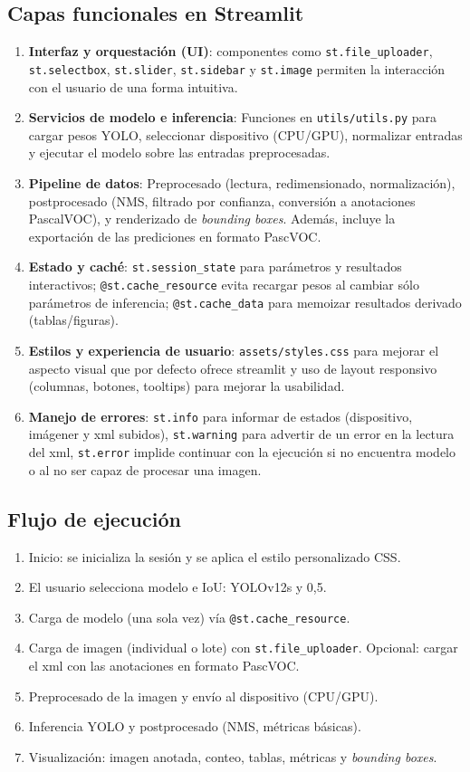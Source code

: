 \documentclass[12pt,a4paper,onecolumn,oneside]{report}
\begin{document}
\subsection{Capas funcionales en Streamlit}
\begin{enumerate}
  \item \textbf{Interfaz y orquestación (UI)}: componentes como \texttt{st.file\_uploader}, \texttt{st.selectbox}, \texttt{st.slider}, \texttt{st.sidebar} y \texttt{st.image} permiten la interacción con el usuario de una forma intuitiva.
  \item \textbf{Servicios de modelo e inferencia}: Funciones en \texttt{utils/utils.py} para cargar pesos YOLO, seleccionar dispositivo (CPU/GPU), normalizar entradas y ejecutar el modelo sobre las entradas preprocesadas.
  \item \textbf{Pipeline de datos}: Preprocesado (lectura, redimensionado, normalización), postprocesado (NMS, filtrado por confianza, conversión a anotaciones PascalVOC), y renderizado de \textit{bounding boxes}. 
  Además, incluye la exportación de las prediciones en formato PascVOC. 
  \item \textbf{Estado y caché}: \texttt{st.session\_state} para parámetros y resultados interactivos; \texttt{@st.cache\_resource} evita recargar 
  pesos al cambiar sólo parámetros de inferencia; \texttt{@st.cache\_data} para memoizar resultados derivado (tablas/figuras).
  \item \textbf{Estilos y experiencia de usuario}: \texttt{assets/styles.css} para mejorar el aspecto visual que por defecto ofrece streamlit y uso de layout 
  responsivo (columnas, botones, tooltips) para mejorar la usabilidad.
  \item \textbf{Manejo de errores}: \texttt{st.info} para informar de estados (dispositivo, imágener y xml subidos), \texttt{st.warning} para advertir de un error en la lectura del xml, 
  \texttt{st.error} implide continuar con la ejecución si no encuentra modelo o al no ser capaz de procesar una imagen.
\end{enumerate}

\subsection{Flujo de ejecución}
\begin{enumerate}
  \item Inicio: se inicializa la sesión y se aplica el estilo personalizado CSS.
  \item El usuario selecciona modelo e IoU: YOLOv12s y 0,5.
  \item Carga de modelo (una sola vez) vía \texttt{@st.cache\_resource}.
  \item Carga de imagen (individual o lote) con \texttt{st.file\_uploader}. Opcional: cargar el xml con las anotaciones en formato PascVOC.
  \item Preprocesado de la imagen y envío al dispositivo (CPU/GPU).
  \item Inferencia YOLO y postprocesado (NMS, métricas básicas).
  \item Visualización: imagen anotada, conteo, tablas, métricas y \textit{bounding boxes}.
\end{enumerate}
\end{document}
